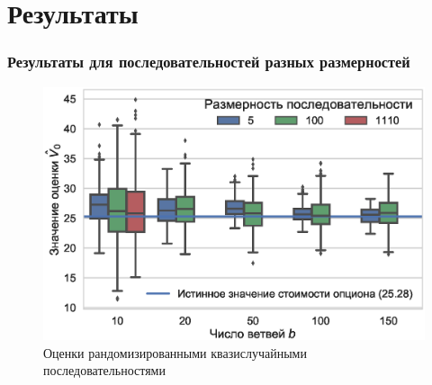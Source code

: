 \documentclass[unicode, notheorems]{beamer}
\begin{document}

\section{Результаты} %
\label{sec:results}
	\begin{frame}
	\frametitle{Результаты для последовательностей разных размерностей} 
	\begin{figure}[h]
	    \centering
		\includegraphics[height=0.75\paperheight]{halton_estimators.eps}
		\caption{Оценки рандомизированными квазислучайными последовательностями}
		\label{fig:halton_estimators}
	\end{figure}
	\end{frame}	
\end{document}
